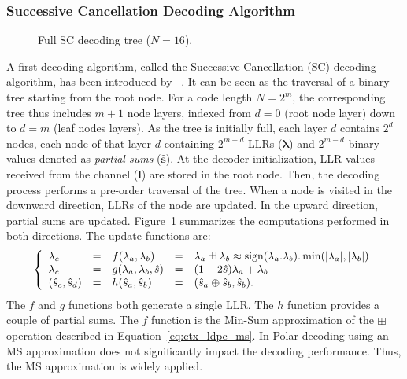 \subsubsection{Successive Cancellation Decoding Algorithm}

\begin{figure}[htp]
  \centering
  \caption{Full SC decoding tree ($N = 16$).}
  \label{fig:ctx_polar_sc_decoder}
\end{figure}

A first decoding algorithm, called the Successive Cancellation (SC) decoding
algorithm, has been introduced by \Arikan~\cite{Arikan2009}. It can be seen as
the traversal of a binary tree starting from the root node. For a code length
$N=2^m$, the corresponding tree thus includes $m + 1$ node layers, indexed from
$d=0$ (root node layer) down to $d=m$ (leaf nodes layers). As the tree is
initially full, each layer $d$ contains $2^d$ nodes, each node of that layer $d$
containing $2^{m-d}$ LLRs ($\bm{\lambda}$) and $2^{m-d}$ binary values denoted
as \textit{partial sums} ($\bm{\hat{s}}$). At the decoder initialization, LLR
values received from the channel ($\bm{l}$) are stored in the root node. Then,
the decoding process performs a pre-order traversal of the tree. When a node is
visited in the downward direction, LLRs of the node are updated. In the upward
direction, partial sums are updated. Figure~\ref{fig:ctx_polar_sc_decoder}
summarizes the computations performed in both directions. The update functions
are:
\begin{eqnarray}
\left\{\begin{array}{l c l c l}
\lambda_c &=& f(\lambda_a,\lambda_b) &=& \lambda_a \boxplus \lambda_b \approx \operatorname*{sign}(\lambda_a.\lambda_b).\min(|\lambda_a|,|\lambda_b|)\\
\lambda_c &=& g(\lambda_a,\lambda_b,\hat{s})&=&(1-2\hat{s})\lambda_a+\lambda_b\\
(\hat{s}_{c}, \hat{s}_{d}) &=& h(\hat{s}_{a}, \hat{s}_{b}) &=& (\hat{s}_{a} \oplus \hat{s}_{b}, \hat{s}_{b}).
\end{array}\right.
\label{eq:ctx_polar_f_g_h}
\end{eqnarray}
The $f$ and $g$ functions both generate a single LLR. The $h$ function provides
a couple of partial sums. The $f$ function is the Min-Sum approximation of the
$\boxplus$ operation described in Equation~\ref{eq:ctx_ldpc_ms}. In Polar
decoding using an MS approximation does not significantly impact the decoding
performance. Thus, the MS approximation is widely applied.

